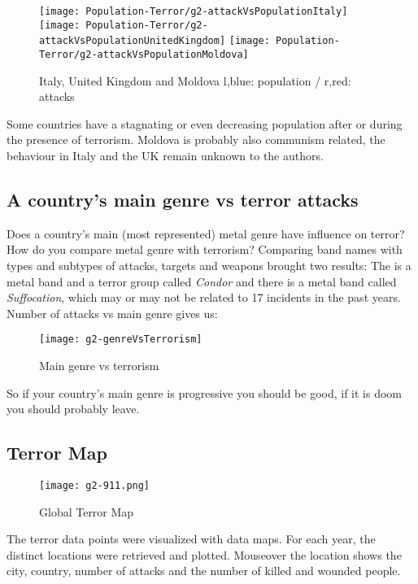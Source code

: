 \begin{figure}[hbt!]
	\texttt{[image: Population-Terror/g2-attackVsPopulationItaly]}
	\centering
	\texttt{[image: Population-Terror/g2-attackVsPopulationUnitedKingdom]}
	\texttt{[image: Population-Terror/g2-attackVsPopulationMoldova]}
	\caption{Italy, United Kingdom and Moldova l,blue: population / r,red: attacks}
\end{figure}

Some countries have a stagnating or even decreasing population after or during the presence of terrorism. Moldova is probably also communism related, the behaviour in Italy and the UK remain unknown to the authors.

\newpage

\subsection{A country's main genre vs terror attacks}
Does a country's main (most represented) metal genre have influence on terror?
How do you compare metal genre with terrorism? Comparing band names with types and subtypes of attacks, targets and weapons brought two results: The is a metal band and a terror group called \emph{Condor} and there is a metal band called \emph{Suffocation}, which may or may not be related to 17 incidents in the past years. Number of attacks vs main genre gives us:



\begin{figure}[hbt!]
	\centering
	\texttt{[image: g2-genreVsTerrorism]}
	\caption{Main genre vs terrorism}
\end{figure}

So if your country's main genre is progressive you should be good, if it is doom you should probably leave.

\newpage

\subsection{Terror Map}

\begin{figure}[hbt!]
	\centering
	\texttt{[image: g2-911.png]}
	\caption{Global Terror Map}
\end{figure}

The terror data points were visualized with data maps. For each year, the distinct locations were retrieved and plotted. Mouseover the location shows the city, country, number of attacks and the number of killed and wounded people.